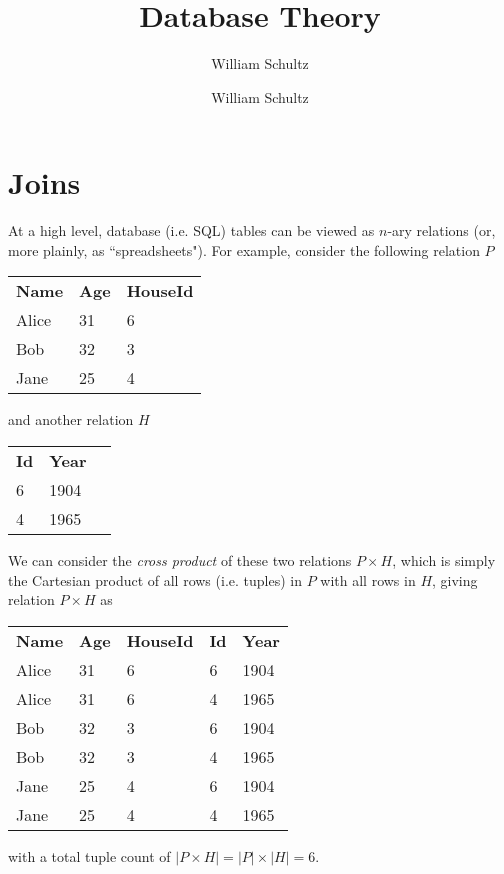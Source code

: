 \documentclass[10pt,a4paper]{article}
\author{William Schultz}
\begin{document}
\title{Database Theory}
\author{William Schultz}
\maketitle

\section*{Joins}

At a high level, database (i.e. SQL) tables can be viewed as $n$-ary relations (or, more plainly, as ``spreadsheets"). For example, consider the following relation $P$
\begin{center}
\begin{tabular}{| l | l | l |}
     \textbf{Name} & \textbf{Age} & \textbf{HouseId} \\ 
     Alice & 31 & 6 \\  
     Bob & 32 & 3 \\    
     Jane & 25 & 4    
\end{tabular}
\end{center}
and another relation $H$
\begin{center}
    \begin{tabular}{| l | l | l |}
         \textbf{Id} & \textbf{Year} \\ 
         6 & 1904 \\ 
         4 & 1965    
\end{tabular}
\end{center}
We can consider the \textit{cross product} of these two relations $P \times H$, which is simply the Cartesian product of all rows (i.e. tuples) in $P$ with all rows in $H$, giving relation $P \times H$ as
\begin{center}
    \begin{tabular}{| l | l | l | l | l |}
        \textbf{Name} & \textbf{Age}& \textbf{HouseId} & \textbf{Id} & \textbf{Year} \\
        Alice & 31 & 6 & 6 & 1904\\  
        Alice & 31 & 6 & 4 & 1965 \\  
        Bob & 32 & 3 & 6 & 1904 \\    
        Bob & 32 & 3 & 4 & 1965  \\    
        Jane & 25 & 4 & 6 & 1904  \\
        Jane & 25 & 4 & 4 & 1965   
\end{tabular}
\end{center}
with a total tuple count of $|P \times H| = |P| \times |H| = 6$.
\end{document}
